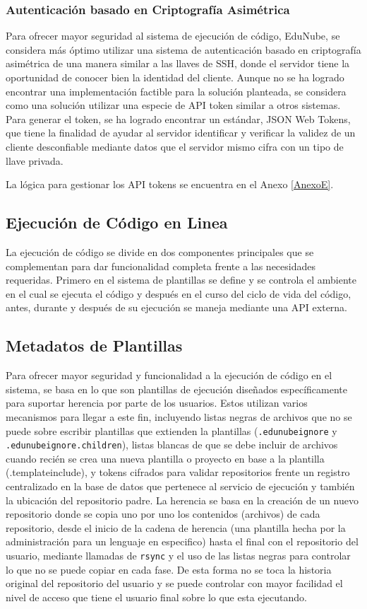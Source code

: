 \subsubsection{Autenticación basado en Criptografía Asimétrica}
Para ofrecer mayor seguridad al sistema de ejecución de código, EduNube, se considera más óptimo utilizar una sistema de autenticación basado en criptografía asimétrica de una manera similar a las llaves de SSH, donde el servidor tiene la oportunidad de conocer bien la identidad del cliente. Aunque no se ha logrado encontrar una implementación factible para la solución planteada, se considera como una solución utilizar una especie de API token similar a otros sistemas. Para generar el token, se ha logrado encontrar un estándar, JSON Web Tokens, que tiene la finalidad de ayudar al servidor identificar y verificar la validez de un cliente desconfiable mediante datos que el servidor mismo cifra con un tipo de llave privada.

La lógica para gestionar los API tokens se encuentra en el Anexo \ref{AnexoE}.

\subsection{Ejecución de Código en Linea}
La ejecución de código se divide en dos componentes principales que se complementan para dar funcionalidad completa frente a las necesidades requeridas. Primero en el sistema de plantillas se define y se controla el ambiente en el cual se ejecuta el código y después en el curso del ciclo de vida del código, antes, durante y después de su ejecución se maneja mediante una API externa.

\subsection{Metadatos de Plantillas}
Para ofrecer mayor seguridad y funcionalidad a la ejecución de código en el sistema, se basa en lo que son plantillas de ejecución diseñados específicamente para suportar herencia por parte de los usuarios. Estos utilizan varios mecanismos para llegar a este fin, incluyendo listas negras de archivos que no se puede sobre escribir plantillas que extienden la plantillas (\texttt{.edunubeignore} y\\ \texttt{.edunubeignore.children}), listas blancas de que se debe incluir de archivos cuando recién se crea una nueva plantilla o proyecto en base a la plantilla (.templateinclude), y tokens cifrados para validar repositorios frente un registro centralizado en la base de datos que pertenece al servicio de ejecución y también la ubicación del repositorio padre. La herencia se basa en la creación de un nuevo repositorio donde se copia uno por uno los contenidos (archivos) de cada repositorio, desde el inicio de la cadena de herencia (una plantilla hecha por la administración para un lenguaje en especifico) hasta el final con el repositorio del usuario, mediante llamadas de \texttt{rsync} y el uso de las listas negras para controlar lo que no se puede copiar en cada fase. De esta forma no se toca la historia original del repositorio del usuario y se puede controlar con mayor facilidad el nivel de acceso que tiene el usuario final sobre lo que esta ejecutando. 

